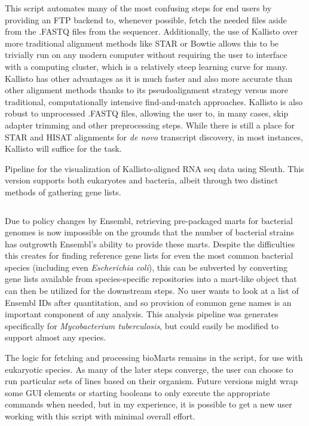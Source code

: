 This script automates many of the most confusing steps for end users by providing an FTP backend to, whenever possible, fetch the needed files aside from the .FASTQ files from the sequencer. Additionally, the use of Kallisto over more traditional alignment methods like STAR or Bowtie allows this to be trivially run on any modern computer without requiring the user to interface with a computing cluster, which is a relatively steep learning curve for many. Kallisto has other advantages as it is much faster and also more accurate than other alignment methods thanks to its pseudoalignment strategy versus more traditional, computationally intensive find\hyp{}and\hyp{}match approaches. Kallisto is also robust to unprocessed .FASTQ files, allowing the user to, in many cases, skip adapter trimming and other preprocessing steps. While there is still a place for STAR and HISAT alignments for \textit{de novo} transcript discovery, in most instances, Kallisto will suffice for the task. 

\begin{code}
\caption{Pipeline for the visualization of Kallisto\hyp{}aligned RNA seq data using Sleuth. This version supports both eukaryotes and bacteria, albeit through two distinct methods of gathering gene lists.}
\label{blinder}

\inputminted[breaklines,frame=single,fontsize=\small]{r}{source/sleuther.R}

\end{code}

Due to policy changes by Ensembl, retrieving pre\hyp{}packaged marts for bacterial genomes is now impossible on the grounds that the number of bacterial strains has outgrowth Ensembl's ability to provide these marts. Despite the difficulties this creates for finding reference gene lists for even the most common bacterial species (including even \textit{Escherichia coli}), this can be subverted by converting gene lists available from species\hyp{}specific repositories into a mart\hyp{}like object that can then be utilized for the downstream steps. No user wants to look at a list of Ensembl IDs after quantitation, and so provision of common gene names is an important component of any analysis. This analysis pipeline was generates specifically for \textit{Mycobacterium tuberculosis}, but could easily be modified to support almost any species.

The logic for fetching and processing bioMarts remains in the script, for use with eukaryotic species. As many of the later steps converge, the user can choose to run particular sets of lines based on their organism. Future versions might wrap some GUI elements or starting booleans to only execute the appropriate commands when needed, but in my experience, it is possible to get a new user working with this script with minimal overall effort.

